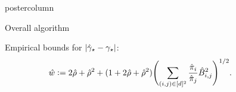 \documentclass[notheorems,final]{beamer}
\newcommand\gap{\ensuremath{\gamma_{\star}}}
\newcommand\hatgap{\ensuremath{\hat{\gamma}_{\star}}}
\begin{document}
\begin{frame}{}
\begin{columns}
\begin{column}{0.24\textwidth}
\begin{beamercolorbox}[center,wd=\textwidth]{postercolumn}
\begin{minipage}[T]{.95\textwidth}
{\begin{block}{Overall algorithm}
\begin{algorithmic}[1]
                  \STATE Empirical bounds for $\abs{\hatgap-\gap}$:
                  \begin{equation}
                    \kern-35pt
                    \hat{w} := 2\hat\rho + \hat\rho^2
                    + (1+2\hat\rho+\hat\rho^2)
                    \Biggl(
                      \sum_{(i,j)\in[d]^2} \frac{\hat\pi_i}{\hat\pi_j} \hat{B}_{i,j}^2
                    \Biggr)^{1/2}
                    .
                    \notag
                  \end{equation}

                \end{algorithmic}
              \end{block}

            }
          \end{minipage}
        \end{beamercolorbox}
      \end{column}
    \end{columns}

    \vfill
  \end{frame}
\end{document}
